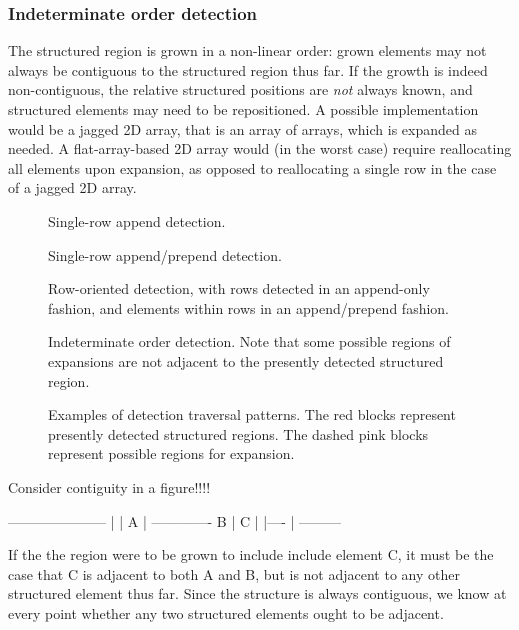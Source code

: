 \subsubsection{Indeterminate order detection}
The structured region is grown in a non-linear order: grown elements may not always be contiguous to the structured region thus far. If the growth is indeed non-contiguous, the relative structured positions are \emph{not} always known, and structured elements may need to be repositioned. A possible implementation would be a jagged 2D array, that is an array of arrays, which is expanded as needed. A flat-array-based 2D array would (in the worst case) require reallocating all elements upon expansion, as opposed to reallocating a single row in the case of a jagged 2D array.


\begin{figure}
\sidebysidefour
{
	
	\caption{Single-row append detection.}
}
{
	
	\caption{Single-row append/prepend detection.}
}
{
	
	\caption{Row-oriented detection, with rows detected in an append-only fashion, and elements within rows in an append/prepend fashion.}
}
{
	
	\caption{Indeterminate order detection. Note that some possible regions of expansions are not adjacent to the presently detected structured region.}
}
\caption{Examples of detection traversal patterns. The red blocks represent presently detected structured regions. The dashed pink blocks represent possible regions for expansion.\label{fig:detection-traversal-patterns}}
\end{figure}




Consider contiguity in a figure!!!!

---------------------
                    |
                    |
          A         |
        -------------
     B  | C |
        |----
        |
---------

If the the region were to be grown to include include element C, it must be the case that C is adjacent to both A and B, but is not adjacent to any other structured element thus far. Since the structure is always contiguous, we know at every point whether any two structured elements ought to be adjacent.


